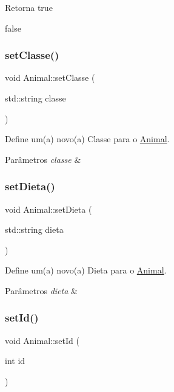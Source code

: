 \begin{DoxyReturn}{Retorna}
true 

false 
\end{DoxyReturn}
\mbox{\label{classAnimal_ae1956de8a017d0b1cd506935cd1a57e0}} 
\subsubsection{\texorpdfstring{set\+Classe()}{setClasse()}}
{\footnotesize\ttfamily void Animal\+::set\+Classe (\begin{DoxyParamCaption}\item[{std\+::string}]{classe }\end{DoxyParamCaption})}



Define um(a) novo(a) Classe para o \hyperlink{classAnimal}{Animal}. 


\begin{DoxyParams}{Parâmetros}
{\em classe} & \\
\hline
\end{DoxyParams}
\mbox{\label{classAnimal_a1b6ae4e4360c2a3b15c1759a654ef84b}} 
\subsubsection{\texorpdfstring{set\+Dieta()}{setDieta()}}
{\footnotesize\ttfamily void Animal\+::set\+Dieta (\begin{DoxyParamCaption}\item[{std\+::string}]{dieta }\end{DoxyParamCaption})}



Define um(a) novo(a) Dieta para o \hyperlink{classAnimal}{Animal}. 


\begin{DoxyParams}{Parâmetros}
{\em dieta} & \\
\hline
\end{DoxyParams}
\mbox{\label{classAnimal_af5a262e8a6e04632a48307101494925c}} 
\subsubsection{\texorpdfstring{set\+Id()}{setId()}}
{\footnotesize\ttfamily void Animal\+::set\+Id (\begin{DoxyParamCaption}\item[{int}]{id }\end{DoxyParamCaption})}



